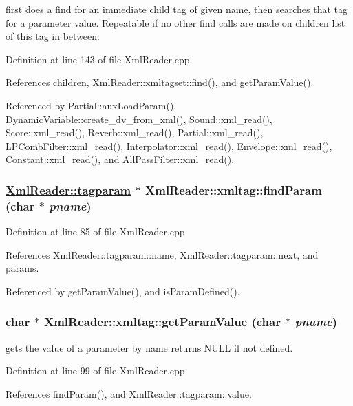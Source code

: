 first does a find for an immediate child tag of given name, then searches that tag for a parameter value. Repeatable if no other find calls are made on children list of this tag in between.

Definition at line 143 of file Xml\-Reader.cpp.

References children, Xml\-Reader::xmltagset::find(), and get\-Param\-Value().

Referenced by Partial::aux\-Load\-Param(), Dynamic\-Variable::create\_\-dv\_\-from\_\-xml(), Sound::xml\_\-read(), Score::xml\_\-read(), Reverb::xml\_\-read(), Partial::xml\_\-read(), LPComb\-Filter::xml\_\-read(), Interpolator::xml\_\-read(), Envelope::xml\_\-read(), Constant::xml\_\-read(), and All\-Pass\-Filter::xml\_\-read().\hypertarget{classXmlReader_1_1xmltag_b0}{
\subsubsection[findParam]{\setlength{\rightskip}{0pt plus 5cm}\hyperlink{classXmlReader_1_1tagparam}{Xml\-Reader::tagparam} $\ast$ Xml\-Reader::xmltag::find\-Param (char $\ast$ {\em pname})}}
\label{classXmlReader_1_1xmltag_b0}




Definition at line 85 of file Xml\-Reader.cpp.

References Xml\-Reader::tagparam::name, Xml\-Reader::tagparam::next, and params.

Referenced by get\-Param\-Value(), and is\-Param\-Defined().\hypertarget{classXmlReader_1_1xmltag_a3}{
\subsubsection[getParamValue]{\setlength{\rightskip}{0pt plus 5cm}char $\ast$ Xml\-Reader::xmltag::get\-Param\-Value (char $\ast$ {\em pname})}}
\label{classXmlReader_1_1xmltag_a3}


gets the value of a parameter by name returns NULL if not defined. 

Definition at line 99 of file Xml\-Reader.cpp.

References find\-Param(), and Xml\-Reader::tagparam::value.

